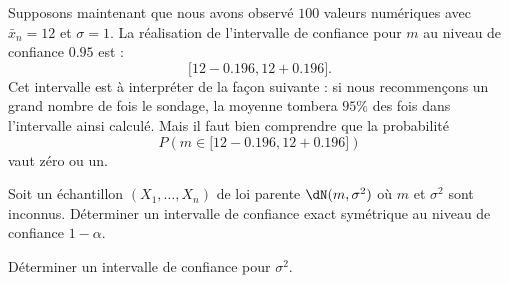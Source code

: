 Supposons maintenant que nous avons observé \( 100\) valeurs numériques avec \( \bar x_n=12\) et \( \sigma=1\). La réalisation de l'intervalle de confiance pour \( m\) au niveau de confiance \( 0.95\) est :
\begin{equation}
	\big[ 12-0.196,12+0.196 \big].
\end{equation}
Cet intervalle est à interpréter de la façon suivante : si nous recommençons un grand nombre de fois le sondage, la moyenne tombera \( 95\%\) des fois dans l'intervalle ainsi calculé. Mais il faut bien comprendre que la probabilité
\begin{equation}
	P\left( m\in\big[ 12-0.196,12+0.196 \big] \right)
\end{equation}
vaut zéro ou un.


\begin{example}

	Soit un échantillon \( (X_1,\ldots,X_n)\) de loi parente \( \dN(m,\sigma^2)\) où \( m\) et \( \sigma^2\) sont inconnus. Déterminer un intervalle de confiance exact symétrique au niveau de confiance \( 1-\alpha\).

	Déterminer un intervalle de confiance pour \( \sigma^2\).


\end{example}

